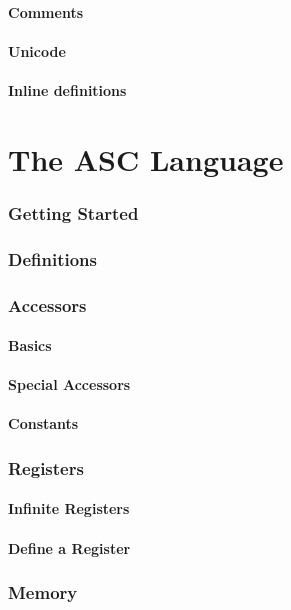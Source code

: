 \documentclass{scrartcl}
\begin{document}
        \subsection{Comments}
        \subsection{Unicode}
        \subsection{Inline definitions}
\part{The ASC Language}
    \section{Getting Started}
    \section{Definitions}
    \section{Accessors}
        \subsection{Basics}
        \subsection{Special Accessors}
        \subsection{Constants}
    \section{Registers}
        \subsection{Infinite Registers}
        \subsection{Define a Register}
    \section{Memory}
\end{document}
